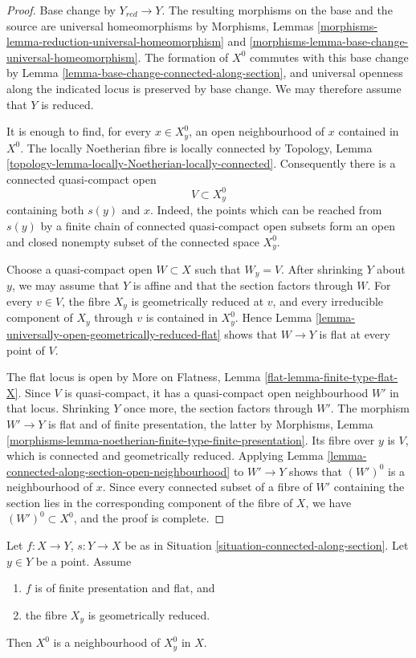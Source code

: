 \begin{proof}
Base change by $Y_{red} \to Y$. The resulting morphisms on the base and the
source are universal homeomorphisms by Morphisms, Lemmas
\ref{morphisms-lemma-reduction-universal-homeomorphism} and
\ref{morphisms-lemma-base-change-universal-homeomorphism}. The formation of
$X^0$ commutes with this base change by
Lemma \ref{lemma-base-change-connected-along-section}, and universal openness
along the indicated locus is preserved by base change. We may therefore
assume that $Y$ is reduced.

It is enough to find, for every $x \in X_y^0$, an open neighbourhood of $x$
contained in $X^0$. The locally Noetherian fibre is locally connected by
Topology, Lemma \ref{topology-lemma-locally-Noetherian-locally-connected}.
Consequently there is a connected quasi-compact open
$$
V \subset X_y^0
$$
containing both $s(y)$ and $x$. Indeed, the points which can be reached from
$s(y)$ by a finite chain of connected quasi-compact open subsets form an open
and closed nonempty subset of the connected space $X_y^0$.

Choose a quasi-compact open $W \subset X$ such that $W_y=V$. After shrinking
$Y$ about $y$, we may assume that $Y$ is affine and that the section factors
through $W$. For every $v \in V$, the fibre $X_y$ is geometrically reduced at
$v$, and every irreducible component of $X_y$ through $v$ is contained in
$X_y^0$. Hence
Lemma \ref{lemma-universally-open-geometrically-reduced-flat} shows that
$W \to Y$ is flat at every point of $V$.

The flat locus is open by More on Flatness, Lemma
\ref{flat-lemma-finite-type-flat-X}. Since $V$ is quasi-compact, it has a
quasi-compact open neighbourhood $W'$ in that locus. Shrinking $Y$ once more,
the section factors through $W'$. The morphism $W' \to Y$ is flat and of
finite presentation, the latter by Morphisms, Lemma
\ref{morphisms-lemma-noetherian-finite-type-finite-presentation}. Its fibre
over $y$ is $V$, which is connected and geometrically reduced. Applying
Lemma \ref{lemma-connected-along-section-open-neighbourhood} to $W' \to Y$
shows that $(W')^0$ is a neighbourhood of $x$. Since every connected subset
of a fibre of $W'$ containing the section lies in the corresponding component
of the fibre of $X$, we have $(W')^0 \subset X^0$, and the proof is complete.
\end{proof}

\begin{lemma}
\label{lemma-connected-along-section-open-neighbourhood}
Let $f : X \to Y$, $s : Y \to X$ be as in
Situation \ref{situation-connected-along-section}.
Let $y \in Y$ be a point.
Assume
\begin{enumerate}
\item $f$ is of finite presentation and flat, and
\item the fibre $X_y$ is geometrically reduced.
\end{enumerate}
Then $X^0$ is a neighbourhood of $X^0_y$ in $X$.
\end{lemma}


